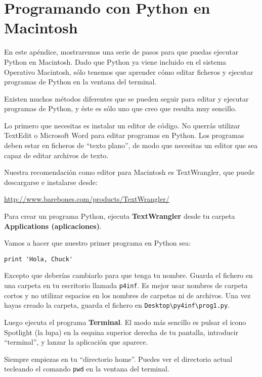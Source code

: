 
\chapter{Programando con Python en Macintosh}

En este apéndice, mostraremos una serie de pasos
para que puedas ejecutar Python en Macintosh. Dado que Python
ya viene incluido en el sistema Operativo Macintosh, sólo
tenemos que aprender cómo editar ficheros y ejecutar programas
de Python en la ventana del terminal.

Existen muchos métodos diferentes que se pueden seguir para editar y ejecutar
programas de Python, y éste es sólo uno que creo que
resulta muy sencillo.

Lo primero que necesitas es instalar un editor de código. No
querrás utilizar TextEdit o Microsoft Word para editar
programas en Python. Los programas deben estar en ficheros de ``texto plano'',
de modo que necesitas un editor que sea capaz de
editar archivos de texto.

Nuestra recomendación como editor para Macintosh es TextWrangler, que
puede descargarse e instalarse desde:

\url{http://www.barebones.com/products/TextWrangler/}

Para crear un programa Python, ejecuta
{\bf TextWrangler} desde tu carpeta {\bf Applications (aplicaciones)}.

Vamos a hacer que nuestro primer programa en Python sea:

\beforeverb
\begin{verbatim}
print 'Hola, Chuck'
\end{verbatim}
\afterverb
%
Excepto que deberías cambiarlo para que tenga tu nombre.
Guarda el fichero en una carpeta en tu escritorio llamada
{\tt p4inf}. Es mejor usar nombres de carpeta cortos
y no utilizar espacios en los nombres de carpetas ni de archivos.
Una vez hayas creado la carpeta, guarda el fichero
en {\tt Desktop{\textbackslash}py4inf{\textbackslash}prog1.py}.

Luego ejecuta el programa {\bf Terminal}. El modo más sencillo es
pulsar el icono Spotlight (la lupa) en la esquina superior
derecha de tu pantalla, introducir ``terminal'', y lanzar la
aplicación que aparece.

Siempre empiezas en tu ``directorio home''. Puedes ver el directorio
actual tecleando el comando {\tt pwd} en la ventana del terminal.

